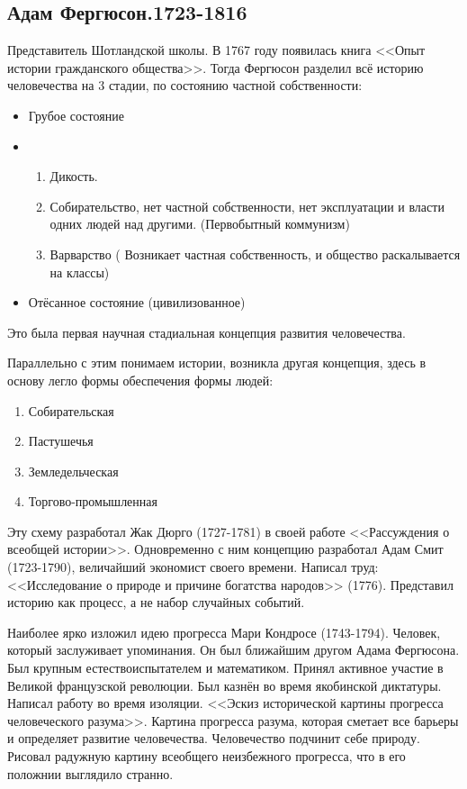 \subsection{Адам Фергюсон.1723-1816}

Представитель Шотландской школы. В 1767 году появилась книга <<Опыт истории гражданского общества>>. Тогда Фергюсон разделил всё историю человечества на 3 стадии, по состоянию частной собственности:

\begin{itemize}
    \item Грубое состояние 
    \item \begin{enumerate}
        \item Дикость. 
        \item Собирательство, нет частной собственности, нет эксплуатации и власти одних людей над другими. (Первобытный коммунизм) 
        \item Варварство ( Возникает частная собственность, и общество раскалывается на классы)
    \end{enumerate}
    \item Отёсанное состояние (цивилизованное)
\end{itemize}
Это была первая научная стадиальная концепция развития человечества.

Параллельно с этим понимаем истории, возникла другая концепция, здесь в основу легло формы обеспечения формы людей:
\begin{enumerate}
    \item Собирательская
    \item Пастушечья
    \item Земледельческая
    \item Торгово-промышленная
\end{enumerate}
Эту схему разработал Жак Дюрго (1727-1781) в своей работе <<Рассуждения о всеобщей истории>>. Одновременно с ним концепцию разработал Адам Смит (1723-1790), величайший экономист своего времени. Написал труд: <<Исследование о природе и причине богатства народов>> (1776). Представил историю как процесс, а не набор случайных событий.

Наиболее ярко изложил идею прогресса Мари Кондросе (1743-1794). Человек, который заслуживает упоминания. Он был ближайшим другом Адама Фергюсона. Был крупным естествоиспытателем и математиком. Принял активное участие в Великой французской революции. Был казнён во время якобинской диктатуры. Написал работу во время изоляции. <<Эскиз исторической картины прогресса человеческого разума>>. Картина прогресса разума, которая сметает все барьеры и определяет развитие человечества. Человечество подчинит себе природу. Рисовал радужную картину всеобщего неизбежного прогресса, что в его положнии выглядило странно.
